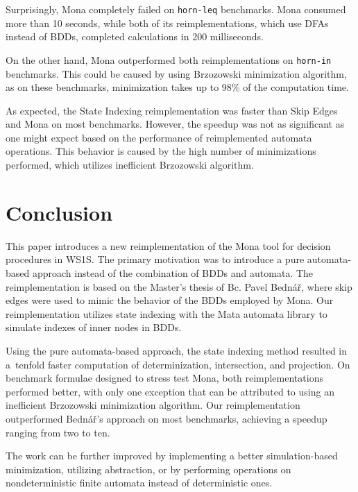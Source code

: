 \documentclass[pdflatex,sn-mathphys-num]{sn-jnl}%
\theoremstyle{thmstyleone}%
\theoremstyle{thmstyletwo}%
\theoremstyle{thmstylethree}%
\begin{document}
        Surprisingly, Mona completely failed on \texttt{horn-leq} benchmarks. Mona consumed more than 10 seconds, while both of its reimplementations, which use DFAs instead of BDDs, completed calculations in 200 milliseconds.

        On the other hand, Mona outperformed both reimplementations on \texttt{horn-in} benchmarks. This could be caused by using Brzozowski minimization algorithm, as on these benchmarks, minimization takes up to 98\% of the computation time.

        As expected, the State Indexing reimplementation was faster than Skip Edges and Mona on most benchmarks. However, the speedup was not as significant as one might expect based on the performance of reimplemented automata operations. This behavior is caused by the high number of minimizations performed, which utilizes inefficient Brzozowski algorithm.

\section{Conclusion}
    This paper introduces a new reimplementation of the Mona tool for decision procedures in WS1S. The primary motivation was to introduce a pure automata-based approach instead of the combination of BDDs and automata. The reimplementation is based on the Master's thesis of Bc. Pavel Bednář, where skip edges were used to mimic the behavior of the BDDs employed by Mona. Our reimplementation utilizes state indexing with the Mata automata library to simulate indexes of inner nodes in BDDs.

    Using the pure automata-based approach, the state indexing method resulted in a~tenfold faster computation of determinization, intersection, and projection. On benchmark formulae designed to stress test Mona, both reimplementations performed better, with only one exception that can be attributed to using an inefficient Brzozowski minimization algorithm. Our reimplementation outperformed Bednář's approach on most benchmarks, achieving a speedup ranging from two to ten.

    The work can be further improved by implementing a better simulation-based minimization, utilizing abstraction, or by performing operations on nondeterministic finite automata instead of deterministic ones.

    \vspace*{-0.5em}

\end{document}
